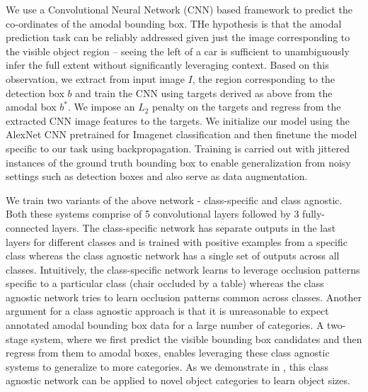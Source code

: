 We use a Convolutional Neural Network (CNN) \cite{neocognitron,LeCun1989} based framework to predict the co-ordinates of the amodal bounding box. THe hypothesis is that the amodal prediction task can be reliably addressed given just the image corresponding to the visible object region -- seeing the left of a car is sufficient to unambiguously infer the full extent without significantly leveraging context. Based on this observation, we extract from input image $I$, the region corresponding to the detection box $b$ and train the CNN using targets derived as above from the amodal box $b^*$. We impose an $L_2$ penalty on the targets and regress from the extracted CNN image features to the targets. We initialize our model using the AlexNet \cite{krizhevsky2012imagenet} CNN pretrained for Imagenet \cite{imagenet_cvpr09} classification and then finetune the model specific to our task using backpropagation. Training is carried out with jittered instances of the ground truth bounding box to enable generalization from noisy settings such as detection boxes and also serve as data augmentation.

We train two variants of the above network - class-specific and class agnostic. Both these systems comprise of 5 convolutional layers followed by 3 fully-connected layers. The class-specific network has separate outputs in the last layers for different classes and is trained with positive examples from a specific class whereas the class agnostic network has a single set of outputs across all classes. Intuitively, the class-specific network learns to leverage occlusion patterns specific to a particular class (\eg chair occluded by a table) whereas the class agnostic network tries to learn occlusion patterns common across classes. Another argument for a class agnostic approach is that it is unreasonable to expect annotated amodal bounding box data for a large number of categories. A two-stage system, where we first predict the visible bounding box candidates and then regress from them to amodal boxes, enables leveraging these class agnostic systems to generalize to more categories. As we demonstrate in , this class agnostic network can be applied to novel object categories to learn object sizes.

